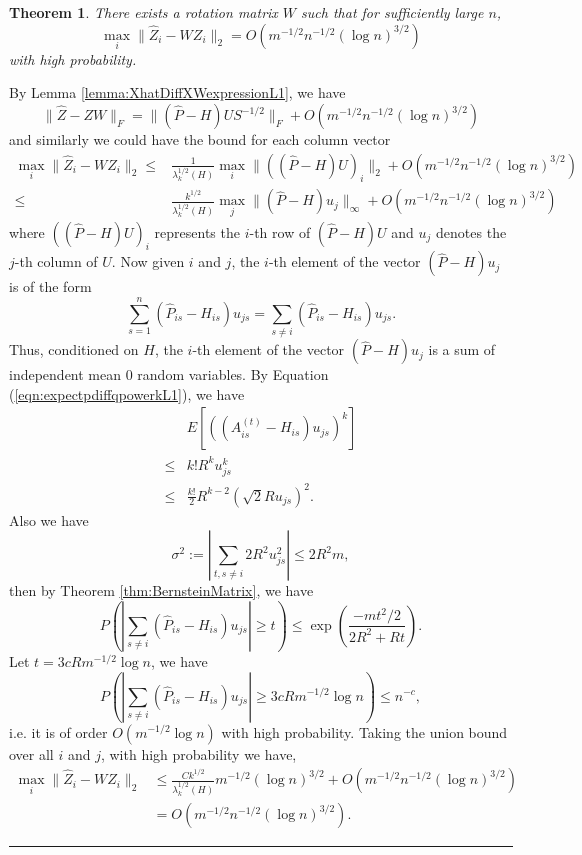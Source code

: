 \documentclass[a4paper]{article}
\newenvironment{proof}{{\bf Proof:  }}{\hfill\rule{2mm}{2mm}}
\newtheorem{theorem}[fact]{Theorem}
\begin{document}
\begin{theorem}
\label{thm:XhatDiffXWL1}
There exists a rotation matrix $W$ such that for sufficiently large $n$,
\[
	\max_i \| \hat{Z}_i - W Z_i \|_2 = O(m^{-1/2} n^{-1/2} (\log n)^{3/2})
\]
with high probability.
\end{theorem}
\begin{proof}
By Lemma \ref{lemma:XhatDiffXWexpressionL1}, we have
\[
	\|\hat{Z} - Z W\|_F = \| (\hat{P} - H) U S^{-1/2} \|_F + O(m^{-1/2} n^{-1/2} (\log n)^{3/2})
\]
and similarly we could have the bound for each column vector
\begin{align*}
	\max_i \| \hat{Z}_i - W Z_i \|_2
    \le & \frac{1}{\lambda_k^{1/2}(H)} \max_i \| ((\hat{P} - H) U)_i \|_2 + O(m^{-1/2} n^{-1/2} (\log n)^{3/2}) \\
    \le & \frac{k^{1/2}}{\lambda_k^{1/2}(H)} \max_j \| (\hat{P} - H) u_j \|_{\infty} + O(m^{-1/2} n^{-1/2} (\log n)^{3/2})
\end{align*}
where $((\hat{P} - H) U)_i$ represents the $i$-th row of $(\hat{P} - H) U$ and $u_j$ denotes the $j$-th column of $U$. Now given $i$ and $j$, the $i$-th element of the vector $(\hat{P} - H) u_j$ is of the form
\[
	\sum_{s=1}^n (\hat{P}_{is} - H_{is}) u_{js} = \sum_{s \ne i} (\hat{P}_{is} - H_{is}) u_{js}.
\]
Thus, conditioned on $H$, the $i$-th element of the vector $(\hat{P} - H) u_j$ is a sum of independent mean 0 random variables.
By Equation (\ref{eqn:expectpdiffqpowerkL1}), we have
\begin{align*}
	& E\left[\left((A^{(t)}_{is} - H_{is}) u_{js}\right)^k\right] \\ 
    \le & k! R^k u_{js}^k \\
    \le & \frac{k!}{2} R^{k-2} (\sqrt{2} R u_{js})^2.
\end{align*}
Also we have
\[
	\sigma^2 := |\sum_{t, s \ne i} 2 R^2 u_{js}^2| \le 2 R^2 m,
\]
then by Theorem \ref{thm:BernsteinMatrix}, we have
\[
	P \left( \left| \sum_{s \ne i} (\hat{P}_{is} - H_{is}) u_{js} \right| \ge t \right)
    \le \exp \left( \frac{-m t^2/2}{2 R^2 + R t} \right).
\]
Let $t = 3 c R m^{-1/2} \log n$, we have
\[
	P \left( \left| \sum_{s \ne i} (\hat{P}_{is} - H_{is}) u_{js} \right| \ge 3 c R m^{-1/2} \log n \right)
    \le n^{-c},
\]
i.e. it is of order $O(m^{-1/2} \log n)$ with high probability.
Taking the union bound over all $i$ and $j$, with high probability we have,
\begin{align*}
	\max_i \| \hat{Z}_i - W Z_i \|_2
    & \le \frac{C k^{1/2}}{\lambda_k^{1/2}(H)} m^{-1/2} (\log n)^{3/2} + O(m^{-1/2} n^{-1/2} (\log n)^{3/2}) \\
    & = O(m^{-1/2} n^{-1/2} (\log n)^{3/2}).
\end{align*}
\end{proof}
\end{document}
